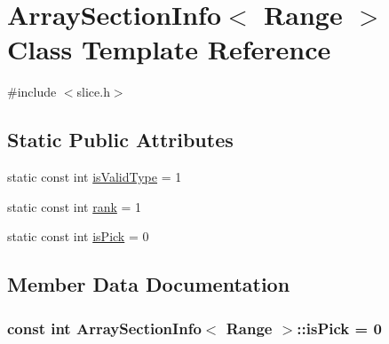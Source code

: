 \hypertarget{classArraySectionInfo_3_01Range_01_4}{}\section{Array\+Section\+Info$<$ Range $>$ Class Template Reference}
\label{classArraySectionInfo_3_01Range_01_4}


{\ttfamily \#include $<$slice.\+h$>$}

\subsection*{Static Public Attributes}
\begin{DoxyCompactItemize}
\item 
static const int \hyperlink{classArraySectionInfo_3_01Range_01_4_ad99e8013ff0e87d680086c9865d602b6}{is\+Valid\+Type} = 1
\item 
static const int \hyperlink{classArraySectionInfo_3_01Range_01_4_ae3f83605b2721c37aff1af6a6aab5c9a}{rank} = 1
\item 
static const int \hyperlink{classArraySectionInfo_3_01Range_01_4_a0badaf9fb837195c5720d7a154da5227}{is\+Pick} = 0
\end{DoxyCompactItemize}


\subsection{Member Data Documentation}
\hypertarget{classArraySectionInfo_3_01Range_01_4_a0badaf9fb837195c5720d7a154da5227}{}
\subsubsection[{is\+Pick}]{\setlength{\rightskip}{0pt plus 5cm}const int {\bf Array\+Section\+Info}$<$ {\bf Range} $>$\+::is\+Pick = 0\hspace{0.3cm}{\ttfamily [static]}}\label{classArraySectionInfo_3_01Range_01_4_a0badaf9fb837195c5720d7a154da5227}
\hypertarget{classArraySectionInfo_3_01Range_01_4_ad99e8013ff0e87d680086c9865d602b6}{}
